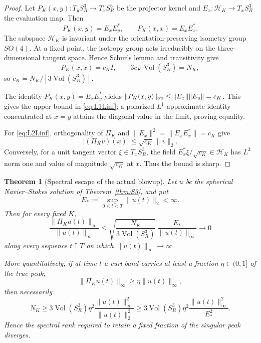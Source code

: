 \documentclass[aps,prd,reprint,superscriptaddress,nofootinbib,floatfix]{revtex4-2}
\newtheorem{theorem}{Theorem}
\theoremstyle{definition}
\theoremstyle{remark}
\newcommand{\Vol}{\operatorname{Vol}}
\begin{document}
\begin{proof}
	Let $P_K(x,y):T_yS^3_R\to T_xS^3_R$ be the projector kernel and
	$E_x:\mathcal H_K\to T_xS^3_R$ the evaluation map. Then
	\begin{equation}
		P_K(x,y)=E_xE_y^*,\qquad P_K(x,x)=E_xE_x^*.
	\end{equation}
	The subspace $\mathcal H_K$ is invariant under the orientation-preserving isometry group $SO(4)$. At a fixed point, the isotropy group acts irreducibly on the three-dimensional tangent space. Hence Schur's lemma and transitivity give
	\begin{equation}
		P_K(x,x)=c_K I,\qquad
		3c_K\Vol(S^3_R)=N_K,
	\end{equation}
	so $c_K=N_K/[3\Vol(S^3_R)]$.

	The identity $P_K(x,y)=E_xE_y^*$ yields
	$\|P_K(x,y)\|_{\rm op}\le\|E_x\|\|E_y\|=c_K$.
	This gives the upper bound in \eqref{eq:L1Linf}; a polarized $L^1$ approximate identity concentrated at $x=y$ attains the diagonal value in the limit, proving equality.

	For \eqref{eq:L2Linf}, orthogonality of $\Pi_K$ and
	$\|E_x\|^2=\|E_xE_x^*\|=c_K$ give
	\begin{equation}
		|(\Pi_Kv)(x)|\le\sqrt{c_K}\,\|v\|_2.
	\end{equation}
	Conversely, for a unit tangent vector $\xi\in T_xS^3_R$, the field
	$E_x^*\xi/\sqrt{c_K}\in\mathcal H_K$ has $L^2$ norm one and value of magnitude $\sqrt{c_K}$ at $x$. Thus the bound is sharp.
\end{proof}

\begin{theorem}[Spectral escape of the actual blowup]\label{thm:spectralescape}
	Let $u$ be the spherical Navier--Stokes solution of Theorem~\ref{thm:S3}, and put
	\begin{equation}
		E_*:=\sup_{0\le t<T}\|u(t)\|_2<\infty.
	\end{equation}
	Then for every fixed $K$,
	\begin{equation}
		\frac{\|\Pi_Ku(t)\|_\infty}{\|u(t)\|_\infty}
		\le
		\sqrt{\frac{N_K}{3\Vol(S^3_R)}}\,
		\frac{E_*}{\|u(t)\|_\infty}
		\longrightarrow0
	\end{equation}
	along every sequence $t\uparrow T$ on which $\|u(t)\|_\infty\to\infty$.

	More quantitatively, if at time $t$ a curl band carries at least a fraction $\eta\in(0,1]$ of the true peak,
	\begin{equation}
		\|\Pi_Ku(t)\|_\infty\ge\eta\|u(t)\|_\infty,
	\end{equation}
	then necessarily
	\begin{equation}
		\boxed{
			N_K\ge
			3\Vol(S^3_R)\eta^2
			\frac{\|u(t)\|_\infty^2}{\|u(t)\|_2^2}
			\ge
			3\Vol(S^3_R)\eta^2
			\frac{\|u(t)\|_\infty^2}{E_*^2}.}
		\label{eq:actualrank}
	\end{equation}
	Hence the spectral rank required to retain a fixed fraction of the singular peak diverges.
\end{theorem}
\end{document}

